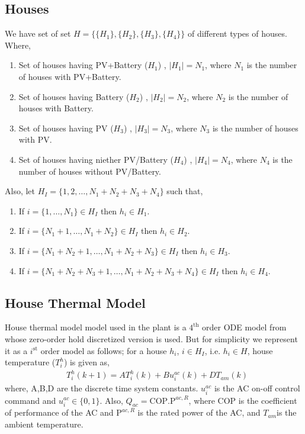 \documentclass[11pt,usenames]{article}
\begin{document}
\subsection{Houses}\label{subsection:Houses}
We have set of set $H = \{ \{H_{1}\},\{H_{2}\},\{H_{3}\},\{H_{4}\}\}$ of different types of houses. Where,

\begin{enumerate}
	\item Set of houses having PV+Battery ($H_{1}$) , $|H_{1}|=N_{1}$, where $N_{1}$ is the number of houses with PV+Battery.
	\item Set of houses having Battery ($H_{2}$) , $|H_{2}|=N_{2}$, where $N_{2}$ is the number of houses with Battery.
	\item Set of houses having PV ($H_{3}$) , $|H_{3}|=N_{3}$, where $N_{3}$ is the number of houses with PV.
	\item Set of houses having niether PV/Battery ($H_{4}$) , $|H_{4}|=N_{4}$, where $N_{4}$ is the number of houses without PV/Battery.	
\end{enumerate}

Also, let $H_{I}=\{1,2,\dots,N_{1}+N_{2}+N_{3}+N_{4}\}$ such that,

\begin{enumerate}
	\item If $i=\{1,\dots,N_{1}\} \in H_{I}$ then $h_{i} \in H_{1}$. 
	\item If $i=\{N_{1}+1,\dots,N_{1}+N_{2}\} \in H_{I}$ then $h_{i} \in H_{2}$. 
	\item If $i=\{N_{1}+N_{2}+1,\dots,N_{1}+N_{2}+N_{3}\} \in H_{I}$ then $h_{i} \in H_{3}$. 
	\item If $i=\{N_{1}+N_{2}+N_{3}+1,\dots,N_{1}+N_{2}+N_{3}+N_{4}\} \in H_{I}$ then $h_{i} \in H_{4}$. 	
\end{enumerate}

\subsection{House Thermal Model}\label{subsection:HouseThermalModel}

House thermal model model used in the plant is a $4^{\text{th}}$ order ODE model from \cite{CuiHybrid:2019} whose zero-order hold discretized version is used. But for simplicity we represent it as a $i^{\text{st}}$ order model as follows; for a house $h_{i}$, $i \in H_{I}$, i.e. $h_{i} \in H$, house temperature ($T_{i}^{h}$) is given as,
\begin{align}
	&T_{i}^{h}(k+1) = A T_{i}^{h}(k)+B u_{i}^{ac}(k)+D T_{am}(k)
\end{align}
where, A,B,D are the discrete time system constants. $u_{i}^{ac}$ is the AC on-off control command and $u_{i}^{ac} \in \{0,1\}$. Also, $Q_{ac}=\text{COP}.\text{P}^{ac,R}$, where COP is the coefficient of performance of the AC and $\text{P}^{ac,R}$ is the rated power of the AC, and $T_{am}$is the ambient temperature.
\end{document}
